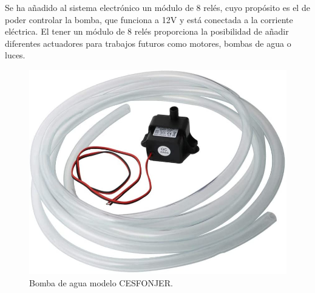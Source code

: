 \documentclass[a4paper, 12pt, oneside]{book}
\begin{document}
Se ha añadido al sistema electrónico un módulo de 8 relés, cuyo propósito es el de poder controlar la bomba, que funciona a 12V y está conectada a la corriente eléctrica. El tener un módulo de 8 relés proporciona la posibilidad de añadir diferentes actuadores para trabajos futuros como motores, bombas de agua o luces.

\begin{figure}[H]
  \centering
  \begin{minipage}[b]{0.4\textwidth}
    \includegraphics[width=\textwidth]{img/bomba_cesfonjer}
    \caption{Bomba de agua modelo CESFONJER.}
    \label{figura:bomba_cesfonjer}
  \end{minipage}
  \hfill
  \begin{minipage}[b]{0.4\textwidth}

\end{minipage}
\end{figure}
\end{document}

